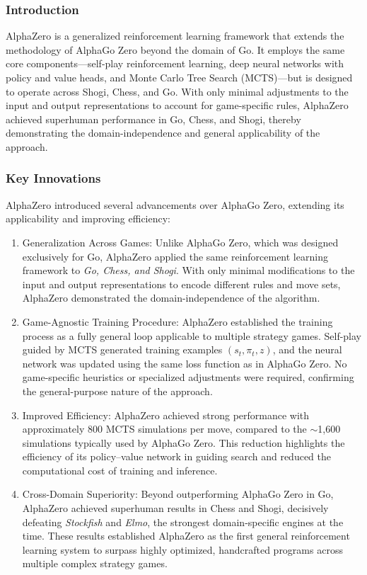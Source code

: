 \subsubsection{Introduction}

AlphaZero is a generalized reinforcement learning framework that extends the methodology of AlphaGo Zero beyond the domain of Go. It employs the same core components—self-play reinforcement learning, deep neural networks with policy and value heads, and Monte Carlo Tree Search (MCTS)—but is designed to operate across Shogi, Chess, and Go. With only minimal adjustments to the input and output representations to account for game-specific rules, AlphaZero achieved superhuman performance in Go, Chess, and Shogi, thereby demonstrating the domain-independence and general applicability of the approach.

\subsubsection{Key Innovations}
AlphaZero introduced several advancements over AlphaGo Zero, 
extending its applicability and improving efficiency:

\begin{enumerate}
    \item Generalization Across Games: Unlike AlphaGo Zero, 
    which was designed exclusively for Go, AlphaZero applied the 
    same reinforcement learning framework to \textit{Go, Chess, and Shogi}. 
    With only minimal modifications to the input and output representations 
    to encode different rules and move sets, AlphaZero demonstrated 
    the domain-independence of the algorithm.
    
    \item Game-Agnostic Training Procedure: AlphaZero 
    established the training process as a fully general loop applicable 
    to multiple strategy games. Self-play guided by MCTS generated 
    training examples $(s_t, \pi_t, z)$, and the neural network was 
    updated using the same loss function as in AlphaGo Zero. 
    No game-specific heuristics or specialized adjustments were required, 
    confirming the general-purpose nature of the approach.
    
    \item Improved Efficiency: AlphaZero achieved strong 
    performance with approximately 800 MCTS simulations per move, 
    compared to the $\sim$1,600 simulations typically used by AlphaGo Zero. 
    This reduction highlights the efficiency of its policy--value network 
    in guiding search and reduced the computational cost of training 
    and inference.
    
    \item Cross-Domain Superiority: Beyond outperforming 
    AlphaGo Zero in Go, AlphaZero achieved superhuman results in Chess 
    and Shogi, decisively defeating \textit{Stockfish} and \textit{Elmo}, 
    the strongest domain-specific engines at the time. These results 
    established AlphaZero as the first general reinforcement learning 
    system to surpass highly optimized, handcrafted programs across 
    multiple complex strategy games.
\end{enumerate}


